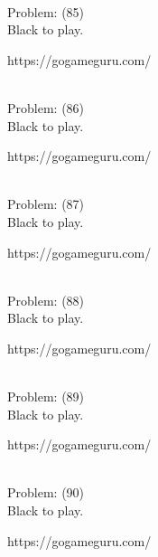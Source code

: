 \documentclass[11pt]{article}
\begin{document}
\begin{minipage}[t]{0.5\textwidth}
  {\centering
  
\\
  Problem: (85)\\
  Black to play.

https://gogameguru.com/\\
  }
\end{minipage}
\begin{minipage}[t]{0.5\textwidth}
  {\centering
  
\\
  Problem: (86)\\
  Black to play.

https://gogameguru.com/\\
  }
\end{minipage}
\begin{minipage}[t]{0.5\textwidth}
  {\centering
  
\\
  Problem: (87)\\
  Black to play.

https://gogameguru.com/\\
  }
\end{minipage}
\begin{minipage}[t]{0.5\textwidth}
  {\centering
  
\\
  Problem: (88)\\
  Black to play.

https://gogameguru.com/\\
  }
\end{minipage}
\begin{minipage}[t]{0.5\textwidth}
  {\centering
  
\\
  Problem: (89)\\
  Black to play.

https://gogameguru.com/\\
  }
\end{minipage}
\begin{minipage}[t]{0.5\textwidth}
  {\centering
  
\\
  Problem: (90)\\
  Black to play.

https://gogameguru.com/\\
  }
\end{minipage}
\end{document}

